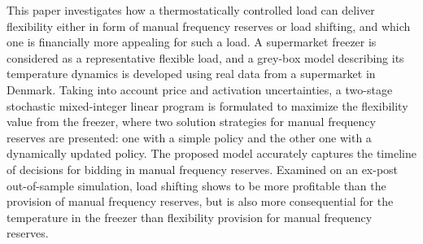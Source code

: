 This paper investigates how a  thermostatically controlled load can deliver flexibility either in form of manual frequency reserves or load shifting, and which one is financially more appealing for such a load. %
A supermarket freezer is considered as a representative flexible load, and a grey-box model  describing its temperature dynamics is developed using real data from a supermarket in Denmark. Taking into account price and activation uncertainties, a two-stage stochastic mixed-integer linear program is formulated to maximize the flexibility value from the freezer, where two solution strategies for manual frequency reserves are presented: one with a simple policy and the other one with a dynamically updated policy. The proposed model accurately captures the timeline of decisions for bidding in manual frequency reserves.
Examined on an ex-post out-of-sample simulation, load shifting shows to be more profitable than the provision of manual frequency reserves, but is also more consequential for the temperature in the freezer than flexibility provision for manual frequency reserves.
